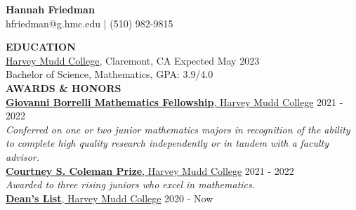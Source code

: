 \documentclass[11pt]{article}
\newcommand{\hdr}[1]{\textcolor{blue(ryb)}{\textbf{#1}}}
\newcommand{\role}[3]{\underline{\textbf{#1}, {#2}} \hfill #3}
\begin{document}
\begin{center}
\hdr{\Large{Hannah Friedman}}\\
hfriedman@g.hmc.edu | (510) 982-9815\\
\end{center}
\medskip
\raggedright
\hdr{EDUCATION}\\
\underline{Harvey Mudd College}, Claremont, CA \hfill Expected May 2023\\
Bachelor of Science, Mathematics, GPA: 3.9/4.0\\
\bigskip
\hdr{AWARDS \& HONORS}\\
\role{Giovanni Borrelli Mathematics Fellowship}{Harvey Mudd College}{2021 - 2022}\\
\textit{Conferred on one or two junior mathematics majors in recognition of the ability to complete high quality research independently or in tandem with a faculty advisor.}\\
\role{Courtney S. Coleman Prize}{Harvey Mudd College}{2021 - 2022}\\
\textit{Awarded to three rising juniors who excel in mathematics.}\\
\role{Dean's List}{Harvey Mudd College}{2020 - Now}\\
\end{document}
